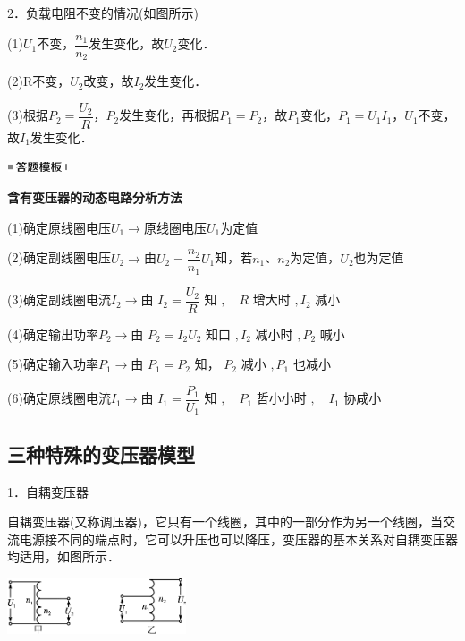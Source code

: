 \documentclass[cn,10.5pt,chinese,mac,chinesefont=founder]{elegantbook}
\begin{document}
2．负载电阻不变的情况(如图所示)

(1)$U_1$不变，$\dfrac{n_{1}}{n_{2}}$发生变化，故$U_2$变化．

(2)R不变，$U_2$改变，故$I_2$发生变化．

(3)根据$P_{2}=\dfrac{U_{2}}{R}$，$P_2$发生变化，再根据$P_1=P_2$，故$P_1$变化，$P_1=U_1I_1$，$U_1$不变，故$I_1$发生变化．

\begin{center}\includegraphics[width=0.70764in,height=0.12292in]{media/image25.png}\end{center}
\begin{center}
	\textbf{含有变压器的动态电路分析方法}
\end{center}

(1)确定原线圈电压$U_1$$\rightarrow$原线圈电压$U_1$为定值

(2)确定副线圈电压$U_2$$\rightarrow$由$U_{2}=\dfrac{n_{2}}{n_{1}} U_{1}$知，若$n_1$、$n_2$为定值，$U_2$也为定值

(3)确定副线圈电流$I_2$$\rightarrow$由 $I_{2}=\dfrac{U_{2}}{R}$ 知 $, \quad R$ 增大时 $, I_{2}$ 减小

(4)确定输出功率$P_2$$\rightarrow$由 $P_{2}=I_{2} U_{2}$ 知口 $, I_{2}$ 减小时 $, P_{2}$ 喊小

(5)确定输入功率$P_1$$\rightarrow$由 $P_{1}=P_{2}$ 知， $P_{2}$ 减小 $, P_{1}$ 也减小

(6)确定原线圈电流$I_1$$\rightarrow$由 $I_{1}=\dfrac{P_{1}}{U_{1}}$ 知 $, \quad P_{1}$ 哲小小时 $, \quad I_{1}$ 协咸小


\newpage
\subsection{三种特殊的变压器模型}

1．自耦变压器

自耦变压器(又称调压器)，它只有一个线圈，其中的一部分作为另一个线圈，当交流电源接不同的端点时，它可以升压也可以降压，变压器的基本关系对自耦变压器均适用，如图所示．

\begin{center}\includegraphics[width=2.08472in,height=0.65069in]{media/image455.png}\end{center}
\end{document}
